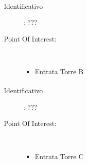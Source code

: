 \documentclass[../SperimentazioniPratiche.tex]{subfiles}
\begin{document}
			\paragraph*{}
			\label{00001}
			\begin{tcolorbox}[fonttitle=\bfseries, 
								adjusted title={\Large Beacon 00001},
								sharp corners=south,
								colback=white, 
								colframe=white!50!blue!75!black]
								
				\begin{description}%
					\item[Identificativo]: ???

					\tcbline					
					
					\item[Point Of Interest:] \ \par
					\begin{itemize}
						\item Entrata Torre B
					\end{itemize}					   				
				\end{description}  				
			\end{tcolorbox}
			
			\paragraph*{}
			\label{00002}
			\begin{tcolorbox}[fonttitle=\bfseries, 
								adjusted title={\Large Beacon 00002},
								sharp corners=south,
								colback=white, 
								colframe=white!50!blue!75!black]
								
				\begin{description}%
					\item[Identificativo]: ???

					\tcbline					
					
					\item[Point Of Interest:] \ \par
					\begin{itemize}
						\item Entrata Torre C
					\end{itemize}					   				
				\end{description}  				
			\end{tcolorbox}
			
\end{document}
